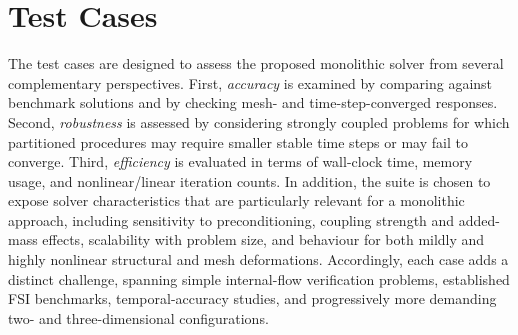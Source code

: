 \section{Test Cases}\label{sec:test_cases}
%
%
%
%
%
%
%
%
%
%
%
The test cases are designed to assess the proposed monolithic solver from several complementary perspectives. First, \emph{accuracy} is examined by comparing against benchmark solutions and by checking mesh- and time-step-converged responses. Second, \emph{robustness} is assessed by considering strongly coupled problems for which partitioned procedures may require smaller stable time steps or may fail to converge. Third, \emph{efficiency} is evaluated in terms of wall-clock time, memory usage, and nonlinear/linear iteration counts. In addition, the suite is chosen to expose solver characteristics that are particularly relevant for a monolithic approach, including sensitivity to preconditioning, coupling strength and added-mass effects, scalability with problem size, and behaviour for both mildly and highly nonlinear structural and mesh deformations. Accordingly, each case adds a distinct challenge, spanning simple internal-flow verification problems, established FSI benchmarks, temporal-accuracy studies, and progressively more demanding two- and three-dimensional configurations.

